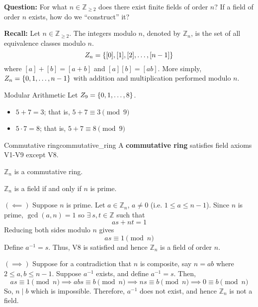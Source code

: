 \textbf{Question:} For what $ n\in\mathbb{Z}_{\geqslant 2} $ does there exist
finite fields of order $ n $? If a field of order $ n $ exists, how do
we ``construct'' it?

\textbf{Recall:} Let $ n\in\mathbb{Z}_{\geqslant 2} $.
The integers modulo $ n $, denoted by
$ \mathbb{Z}_n $, is the set of all equivalence classes modulo $ n $.
\[ \relax{Z}_n=\{[0],[1],[2],\ldots ,[n-1]\} \]
where $ [a]+[b]=[a+b] $ and $ [a][b]=[ab] $.
More simply, $ \relax{Z}_{n}=\{0,1,\ldots ,n-1\} $
with addition and multiplication performed modulo $ n $.

\begin{Example}{Modular Arithmetic}{}
    Let $ \relax{Z}_9=\{0,1,\ldots ,8\} $.
    \begin{itemize}
        \item $ 5+7=3 $; that is, $ 5+7\equiv 3 \pmod{9} $
        \item $ 5\cdot 7=8 $; that is, $ 5+7\equiv 8 \pmod{9} $
    \end{itemize}
\end{Example}

\begin{Definition}{Commutative ring}{commutative_ring}
    A \textbf{commutative ring} satisfies field axioms V1-V9 except
    V8.
\end{Definition}

\begin{Theorem}{}{}
    $ \mathbb{Z}_n $ is a commutative ring.
\end{Theorem}

\begin{Theorem}{}{}
    $ \mathbb{Z}_n $ is a field if and only if $ n $ is prime.
\end{Theorem}

\begin{Proof}{}{}
    $ (\impliedby) $ Suppose $ n $ is prime. Let $ a\in\mathbb{Z}_n $, $ a\neq 0 $
    (i.e. $ 1\leqslant a\leqslant n-1 $). Since $ n $ is prime, $ \gcd(a,n)=1 $
    so $ \exists\ s,t\in\mathbb{Z} $ such that
    \[ as+nt=1 \]
    Reducing both sides modulo $ n $ gives
    \[ as\equiv 1 \pmod{n} \]
    Define $ a^{-1}=s $. Thus, V8 is satisfied and hence $ \mathbb{Z}_n $
    is a field of order $ n $.

    $ (\implies) $ Suppose for a contradiction that $ n $ is composite, say $ n=ab $
    where $ 2\leqslant a,b\leqslant n-1 $. Suppose $ a^{-1} $ exists, and define
    $ a^{-1}=s $. Then,
    \[ as\equiv 1 \pmod{n}\implies abs\equiv b\pmod{n}\implies ns\equiv b \pmod{n}
        \implies 0\equiv b\pmod{n} \]
    So, $ n\mid b $ which is impossible. Therefore, $ a^{-1} $ does not exist, and hence
    $ \mathbb{Z}_n $ is not a field.
\end{Proof}

